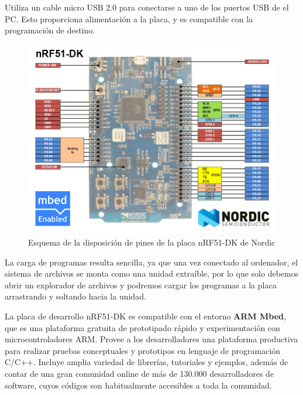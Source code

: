 Utiliza un cable micro USB 2.0 para conectarse a uno de los puertos USB de el PC. Esto proporciona alimentación a la placa, y es compatible con la programación de destino.

\begin{figure}[h]%
	\centering
    \includegraphics[scale=0.5]{figures/nRF51DK_pines.png} %

    \caption[Esquema de la disposición de pines de la placa nRF51-DK de Nordic]{Esquema de la disposición de pines de la placa nRF51-DK de Nordic}

   \label{figuraNordicNRF51}
\end{figure}

La carga de programas resulta sencilla, ya que una vez conectado al ordenador, el sistema de archivos se monta como una unidad extraíble, por lo que solo debemos abrir un explorador de archivos y podremos cargar los programas a la placa arrastrando y soltando hacia la unidad.

La placa de desarrollo nRF51-DK es compatible con el entorno \textbf{ARM Mbed}, que es una plataforma gratuita de prototipado rápido y experimentación con microcontroladores ARM. Provee a los desarrolladores una plataforma productiva para realizar pruebas conceptuales y prototipos en lenguaje de programación C/C++. Incluye amplia variedad de librerías, tutoriales y ejemplos, además de contar de una gran comunidad online de más de 130.000 desarrolladores de software, cuyos códigos son habitualmente accesibles a toda la comunidad.


